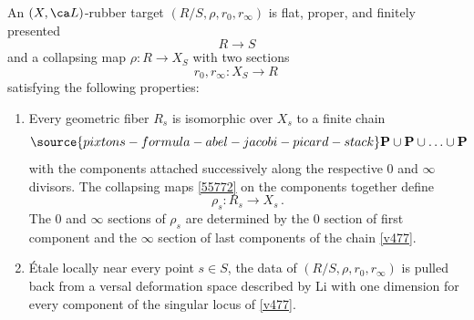 \begin{definition}
\notready\label{def:rubber_target} An $(X,\ca L)$-rubber target $(R/S,\rho, r_0,r_\infty)$ is flat,
proper, and finitely presented
$$ R \to S$$
and a collapsing map $\rho: R \to X_S$
with two sections
$$r_0,r_\infty: X_S \to R\, $$
satisfying the following properties:
\begin{enumerate}
    \item [(i)]
    Every geometric fiber  $R_s$ is isomorphic over $X_s$ to
    a finite chain
    \begin{equation}\label{v477}
\source{pixtons-formula-abel-jacobi-picard-stack}
    \mathbf{P}\cup \mathbf{P} \cup \ldots \cup \mathbf{P}
    \end{equation}
    with the components attached successively along the respective
    $0$ and $\infty$ divisors. The collapsing maps \eqref{55772} on the
    components together define $$\rho_s: R_s \to X_s\,.$$
    The $0$ and $\infty$ sections of $\rho_s$ are determined
    by the $0$ section of first component  and the $\infty$ section of
    last components of the chain \eqref{v477}.
    \item[(ii)] \'Etale locally near every point $s\in S$, the data
    of $(R/S,\rho, r_0,r_\infty)$ is pulled back from
    a versal deformation space described by Li \cite{Li2001-Stable}
    with one dimension for every component of the singular locus of \eqref{v477}. %
\end{enumerate}
\end{definition}
